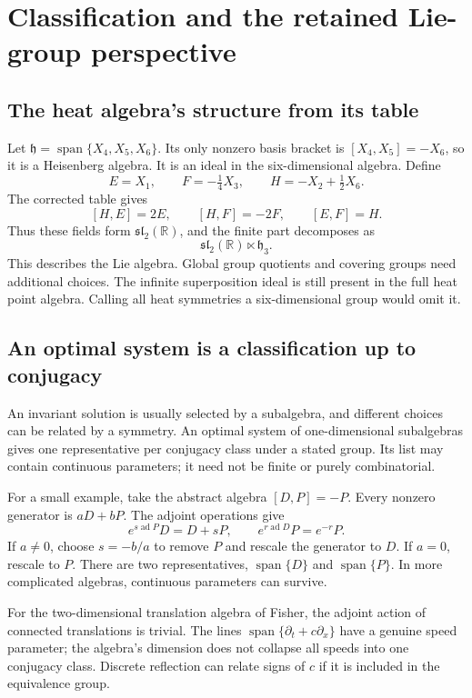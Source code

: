\documentclass[11pt,a4paper]{article}
\numberwithin{equation}{section}
\theoremstyle{definition}
\theoremstyle{plain}
\theoremstyle{remark}
\newcommand{\R}{\mathbb R}
\newcommand{\Span}{\operatorname{span}}
\begin{document}
\section{Classification and the retained Lie-group perspective}\label{sec:classify}
\subsection{The heat algebra's structure from its table}
Let $\mathfrak h=\Span\{X_4,X_5,X_6\}$. Its only nonzero basis bracket is $[X_4,X_5]=-X_6$, so it is a Heisenberg algebra. It is an ideal in the six-dimensional algebra. Define
\[
E=X_1,\qquad F=-\tfrac14X_3,\qquad H=-X_2+\tfrac12X_6.
\]
The corrected table gives
\[
[H,E]=2E,\qquad[H,F]=-2F,\qquad[E,F]=H.
\]
Thus these fields form $\mathfrak{sl}_2(\R)$, and the finite part decomposes as
\[
\mathfrak{sl}_2(\R)\ltimes\mathfrak h_3.
\]
This describes the Lie algebra. Global group quotients and covering groups need additional choices. The infinite superposition ideal is still present in the full heat point algebra. Calling all heat symmetries a six-dimensional group would omit it.

\subsection{An optimal system is a classification up to conjugacy}
An invariant solution is usually selected by a subalgebra, and different choices can be related by a symmetry. An optimal system of one-dimensional subalgebras gives one representative per conjugacy class under a stated group. Its list may contain continuous parameters; it need not be finite or purely combinatorial.

For a small example, take the abstract algebra $[D,P]=-P$. Every nonzero generator is $aD+bP$. The adjoint operations give
\[
e^{s\operatorname{ad}P}D=D+sP,\qquad
 e^{r\operatorname{ad}D}P=e^{-r}P.
\]
If $a\ne0$, choose $s=-b/a$ to remove $P$ and rescale the generator to $D$. If $a=0$, rescale to $P$. There are two representatives, $\Span\{D\}$ and $\Span\{P\}$. In more complicated algebras, continuous parameters can survive.

For the two-dimensional translation algebra of Fisher, the adjoint action of connected translations is trivial. The lines $\Span\{\partial_t+c\partial_x\}$ have a genuine speed parameter; the algebra's dimension does not collapse all speeds into one conjugacy class. Discrete reflection can relate signs of $c$ if it is included in the equivalence group.
\end{document}
